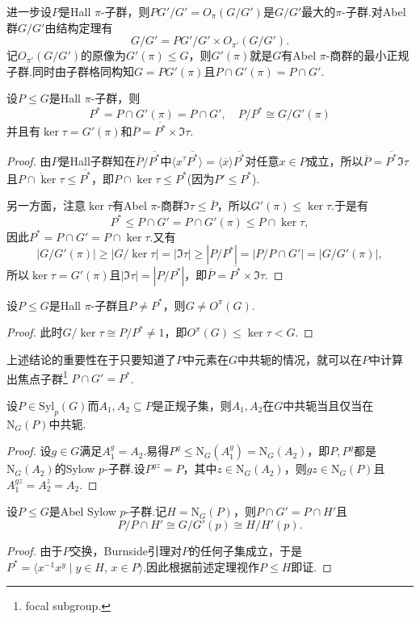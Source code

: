 进一步设$P$是Hall $\pi$-子群，则$PG'/G'=O_\pi(G/G')$是$G/G'$最大的$\pi$-子群.对Abel群$G/G'$由结构定理有
\[
	G/G'=PG'/G'\times O_{\pi'}(G/G').
\]
记$O_{\pi'}(G/G')$的原像为$G'(\pi)\le G$，则$G'(\pi)$就是$G$有Abel $\pi$-商群的最小正规子群.同时由子群格同构知$G=PG'(\pi)$且$P\cap G'(\pi)=P\cap G'$.
\begin{thm}
	设$P\le G$是Hall $\pi$-子群，则
	\[
		P^*=P\cap G'(\pi)=P\cap G',\quad P/P^*\cong G/G'(\pi)
	\]
	并且有$\ker\tau=G'(\pi)$和$\overline{P}=\overline{P^*}\times\Im\tau$.
\end{thm}
\begin{proof}
	由$P$是Hall子群知在$\overline{P}/\overline{P^*}$中$\langle x^\tau\overline{P^*}\rangle=\langle \overline{x}\rangle\overline{P^*}$对任意$x\in P$成立，所以$\overline{P}=\overline{P^*}\Im\tau$且$\overline{P\cap\ker\tau}\le\overline{P^*}$，即$P\cap\ker\tau\le P^*$(因为$P'\le P^*$).

	另一方面，注意$\ker\tau$有Abel $\pi$-商群$\Im\tau\le\overline{P}$，所以$G'(\pi)\le\ker\tau$.于是有
	\[
		P^*\le P\cap G'=P\cap G'(\pi)\le P\cap\ker\tau,
	\]
	因此$P^*=P\cap G'=P\cap\ker\tau$.又有
	\[
		|G/G'(\pi)|\ge|G/\ker\tau|=|\Im\tau|\ge|P/P^*|=|P/P\cap G'|=|G/G'(\pi)|,
	\]
	所以$\ker\tau=G'(\pi)$且$|\Im\tau|=|P/P^*|$，即$\overline{P}=\overline{P^*}\times\Im\tau$.
\end{proof}
\begin{cor*}
	设$P\le G$是Hall $\pi$-子群且$P\ne P^*$，则$G\ne O^\pi(G)$.
\end{cor*}
\begin{proof}
	此时$G/\ker\tau\cong P/P^*\ne 1$，即$O^\pi(G)\le\ker\tau<G$.
\end{proof}

上述结论的重要性在于只要知道了$P$中元素在$G$中共轭的情况，就可以在$P$中计算出{\heiti 焦点子群}\footnote{focal subgroup.} $P\cap G'=P^*$.
\begin{lemma*}[(Burnside)]
	设$P\in\mathrm{Syl}_p(G)$而$A_1,A_2\subseteq P$是正规子集，则$A_1,A_2$在$G$中共轭当且仅当在$\mathrm{N}_G(P)$中共轭.
\end{lemma*}
\begin{proof}
	设$g\in G$满足$A_1^g=A_2$.易得$P^g\le\mathrm{N}_G(A_1^g)=\mathrm{N}_G(A_2)$，即$P,P^g$都是$\mathrm{N}_G(A_2)$的Sylow $p$-子群.设$P^{gz}=P$，其中$z\in\mathrm{N}_G(A_2)$，则$gz\in\mathrm{N}_G(P)$且$A_1^{gz}=A_2^z=A_2$.
\end{proof}
\begin{prop}
	设$P\le G$是Abel Sylow $p$-子群.记$H=\mathrm{N}_G(P)$，则$P\cap G'=P\cap H'$且
	\[
		P/P\cap H'\cong G/G'(p)\cong H/H'(p).
	\]
\end{prop}
\begin{proof}
	由于$P$交换，Burnside引理对$P$的任何子集成立，于是$P^*=\langle x^{-1}x^y\mid y\in H,\,x\in P\rangle $.因此根据前述定理视作$P\le H$即证.
\end{proof}

